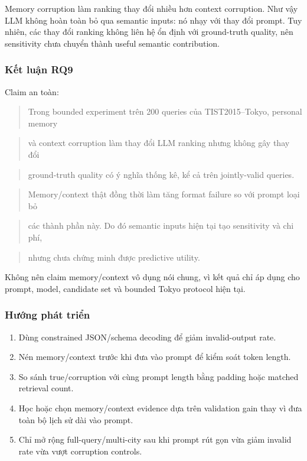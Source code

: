 Memory corruption làm ranking thay đổi nhiều hơn context corruption. Như vậy LLM không hoàn toàn bỏ qua semantic inputs: nó nhạy với thay đổi prompt. Tuy nhiên, các thay đổi ranking không liên hệ ổn định với ground-truth quality, nên sensitivity chưa chuyển thành useful semantic contribution.

\subsubsection*{Kết luận RQ9}

Claim an toàn:

\begin{quote}\small Trong bounded experiment trên 200 queries của TIST2015--Tokyo, personal memory\end{quote}
\begin{quote}\small và context corruption làm thay đổi LLM ranking nhưng không gây thay đổi\end{quote}
\begin{quote}\small ground-truth quality có ý nghĩa thống kê, kể cả trên jointly-valid queries.\end{quote}
\begin{quote}\small Memory/context thật đồng thời làm tăng format failure so với prompt loại bỏ\end{quote}
\begin{quote}\small các thành phần này. Do đó semantic inputs hiện tại tạo sensitivity và chi phí,\end{quote}
\begin{quote}\small nhưng chưa chứng minh được predictive utility.\end{quote}
Không nên claim memory/context vô dụng nói chung, vì kết quả chỉ áp dụng cho prompt, model, candidate set và bounded Tokyo protocol hiện tại.

\subsubsection*{Hướng phát triển}

\begin{enumerate}
\item Dùng constrained JSON/schema decoding để giảm invalid-output rate.
\item Nén memory/context trước khi đưa vào prompt để kiểm soát token length.
\item So sánh true/corruption với cùng prompt length bằng padding hoặc matched
retrieval count.

\item Học hoặc chọn memory/context evidence dựa trên validation gain thay vì đưa
toàn bộ lịch sử dài vào prompt.

\item Chỉ mở rộng full-query/multi-city sau khi prompt rút gọn vừa giảm invalid
rate vừa vượt corruption controls.

\end{enumerate}

